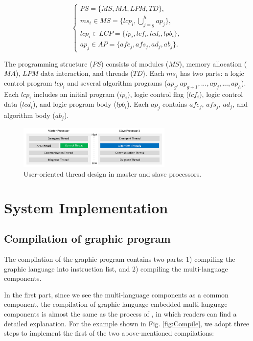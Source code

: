 \documentclass[journal,UTF8]{IEEEtran}
\begin{document}
\begin{equation}
	\left\{
	\begin{array}{l}
	PS = \{MS, MA , LPM, TD\},\\
	ms_i \in MS = \{lcp_i, \bigcup_{j=g}^h ap_j\},\\
	lcp_i \in LCP = \{ip_i, lcf_i, lcd_i, lpb_i\},\\
	ap_j \in AP = \{afe_j, afs_j, ad_j, ab_j\}.
	\end{array}
	\right.
	\end{equation}

The programming structure ($PS$) consists of modules ($MS$), memory allocation ($MA$), $LPM$ data interaction, and threads ($TD$). Each $ms_i$ has two parts: a logic control program $lcp_i$ and several algorithm programs ($ap_g, ap_{g+1},..., ap_{j},..., ap_{h}$). Each $lcp_i$ includes an initial program ($ip_i$), logic control flag ($lcf_i$), logic control data ($lcd_i$), and logic program body ($lpb_i$). Each $ap_{j}$ contains $afe_{j}$, $afs_{j}$, $ad_{j}$, and algorithm body ($ab_{j}$).

\begin{figure}
	\centering
	\includegraphics[width=3in]{fig/FIG5.pdf}
	\caption{ User-oriented thread design in master and slave processors.}
	\label{fig:Threads}
\end{figure}
 \section{System Implementation}
 \label{Process}
 \subsection{Compilation of graphic program}
The compilation of the graphic program contains two parts: 1) compiling the graphic language into instruction list, and 2) compiling the multi-language components.
 	
In the first part, since we see the multi-language components as a common component, the compilation of graphic language embedded multi-language components is almost the same as the process of \cite{Yan2010Compiling}, in which readers can find a detailed explanation. For the example shown in Fig. \ref{fig:Compile}, we adopt three steps to implement the first of the two above-mentioned compilations:
 	
\end{document}
